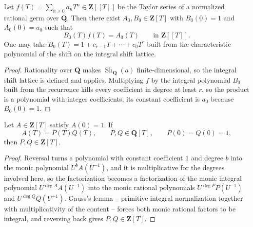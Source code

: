 \begin{proposition}
\label{prop:zla-integral-presentation}
\leanok
Let $f(T)=\sum_{n\geq0}a_nT^n\in\mathbf Z[[T]]$ be the Taylor series of a
normalized rational germ over $\mathbf Q$.  Then there exist
$A_0,B_0\in\mathbf Z[T]$ with $B_0(0)=1$ and $A_0(0)=a_0$ such that
\[
  B_0(T)f(T)=A_0(T)
  \qquad\text{in }\mathbf Z[[T]].
\]
One may take $B_0(T)=1+c_{r-1}T+\cdots+c_0T^r$ built from the characteristic
polynomial of the shift on the integral shift lattice.
\end{proposition}
\begin{proof}
\leanok
Rationality over $\mathbf Q$ makes $\operatorname{Sh}_{\mathbf Q}(a)$
finite-dimensional, so the integral shift lattice is defined and
 applies.  Multiplying $f$ by the
integral polynomial $B_0$ built from the recurrence kills every coefficient in
degree at least $r$, so the product is a polynomial with integer coefficients;
its constant coefficient is $a_0$ because $B_0(0)=1$.
\end{proof}

\begin{lemma}
\label{lem:zla-normalized-gauss}
\leanok
Let $A\in\mathbf Z[T]$ satisfy $A(0)=1$.  If
\[
  A(T)=P(T)Q(T),\qquad P,Q\in\mathbf Q[T],\qquad P(0)=Q(0)=1,
\]
then $P,Q\in\mathbf Z[T]$.
\end{lemma}
\begin{proof}
\leanok
Reversal turns a polynomial with constant coefficient $1$ and degree $b$ into
the monic polynomial $U^bA(U^{-1})$, and it is multiplicative for the
degrees involved here, so the factorization becomes a factorization of the
monic integral polynomial $U^{\deg A}A(U^{-1})$ into the monic rational
polynomials $U^{\deg P}P(U^{-1})$ and $U^{\deg Q}Q(U^{-1})$.  Gauss's lemma --
primitive integral normalization together with multiplicativity of the content
-- forces both monic rational factors to be integral, and reversing back gives
$P,Q\in\mathbf Z[T]$.
\end{proof}

